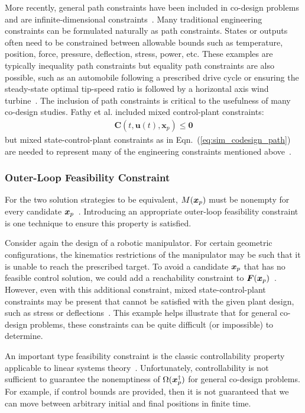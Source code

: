 More recently, general path constraints have been included in co-design problems and are infinite-dimensional constraints~\cite{Herber2014a, Allison2014a, Allison2014b, Allison2013d}. 
Many traditional engineering constraints can be formulated naturally as path constraints.
States or outputs often need to be constrained between allowable bounds such as temperature, position, force, pressure, deflection, stress, power, etc. 
These examples are typically inequality path constraints but equality path constraints are also possible, such as an automobile following a prescribed drive cycle or ensuring the steady-state optimal tip-speed ratio is followed by a horizontal axis wind turbine~\cite{Deshmukh2016a}.
The inclusion of path constraints is critical to the usefulness of many co-design studies.
Fathy et al. included mixed control-plant constraints:
\begin{align}
\bm{C}\left(t, \bm{u}(t), \bm{x}_p \right) \leq \bm{0}
\end{align}
\noindent 
but mixed state-control-plant constraints as in Eqn.~(\ref{eq:sim_codesign_path}) are needed to represent many of the engineering constraints mentioned above~\cite{Fathy2001a}.

\subsubsection{Outer-Loop Feasibility Constraint}

For the two solution strategies to be equivalent, $M(\bm{x}_p)$ must be nonempty for every candidate $\bm{x}_p$~\cite{Fathy2001a}. Introducing an appropriate outer-loop feasibility constraint is one technique to ensure this property is satisfied.

Consider again the design of a robotic manipulator. For certain geometric configurations, the kinematics restrictions of the manipulator may be such that it is unable to reach the prescribed target.
To avoid a candidate $\bm{x}_p$ that has no feasible control solution, we could add a reachability constraint to $\bm{F}(\bm{x}_p)$~\cite{Allison2013d, Spong2005a}.
However, even with this additional constraint, mixed state-control-plant constraints may be present that cannot be satisfied with the given plant design, such as stress or deflections~\cite{Allison2013d}.
This example helps illustrate that for general co-design problems, these constraints can be quite difficult (or impossible) to determine.

An important type feasibility constraint is the classic controllability property applicable to linear systems theory~\cite{Fathy2001a}.
Unfortunately, controllability is not sufficient to guarantee the nonemptiness of $\Omega(\bm{x}_p^{\dagger})$ for general co-design problems.
For example, if control bounds are provided, then it is not guaranteed that we can move between arbitrary initial and final positions in finite time.

